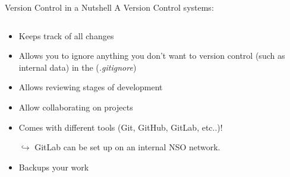 \documentclass[xcolor=x11names,compress, aspectratio=169]{beamer}
\renewcommand{\(}{\begin{columns}}
\renewcommand{\)}{\end{columns}}
\newcommand{\<}[1]{\begin{column}{#1}}
\renewcommand{\>}{\end{column}}
\begin{document}
\begin{frame}{Version Control in a Nutshell }
A Version Control systems:
\begin{columns}[t]
\begin{column}{0.8\textwidth}
\begin{itemize}[<+->]
    \item Keeps track of all changes
    \item Allows you to ignore anything you don't want to version control (such as internal data) in the (\emph{.gitignore})
    \item Allows reviewing stages of development
    \item Allow collaborating on projects
    \item Comes with different tools (Git, GitHub, GitLab, etc..)!
    \item[$\hookrightarrow$]  GitLab can be set up on an internal NSO network.
    \item Backups your work
  \end{itemize}
 \end{column}
  \begin{column}{0.2\textwidth}
    \begin{center}
    \begin{itemize}
    \end{itemize}
    \end{center}
  \end{column}
\end{columns}
\end{frame}
\end{document}
